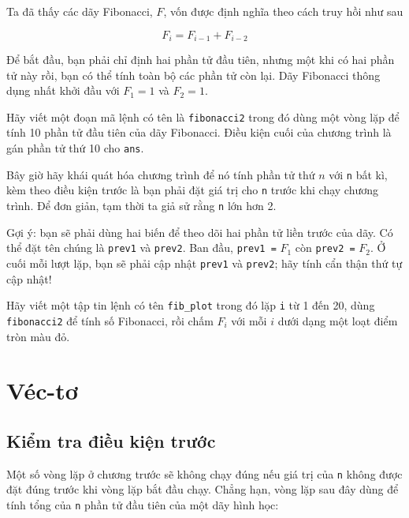\documentclass[12pt]{book}
\begin{document}
\begin{ex}
\label{fib2}

Ta đã thấy các dãy Fibonacci, $F$, vốn được định nghĩa theo cách
truy hồi như sau

\[ F_{i} = F_{i-1} + F_{i-2} \]

Để bắt đầu, bạn phải chỉ định hai phần tử đầu tiên, nhưng một khi
có hai phần tử này rồi, bạn có thể tính toàn bộ các phần tử còn lại.
Dãy Fibonacci thông dụng nhất khởi đầu với $F_1 = 1$ và $F_2 = 1$.

Hãy viết một đoạn mã lệnh có tên là {\tt fibonacci2} trong đó dùng
một vòng lặp để tính 10 phần tử đầu tiên của dãy Fibonacci. Điều 
kiện cuối của chương trình là gán phần tử thứ 10 cho {\tt ans}.

Bây giờ hãy khái quát hóa chương trình để nó tính phần tử thứ
$n$ với {\tt n} bất kì, kèm theo điều kiện trước là bạn phải đặt 
giá trị cho {\tt n} trước khi chạy chương trình. Để đơn giản, tạm thời
ta giả sử rằng {\tt n} lớn hơn 2.

Gợi ý: bạn sẽ phải dùng hai biến để theo dõi hai phần tử liền trước
của dãy. Có thể đặt tên chúng là {\tt prev1} và {\tt prev2}.
Ban đầu, {\tt prev1 =} $F_1$ còn {\tt prev2 =} $F_2$.  Ở cuối
mỗi lượt lặp, bạn sẽ phải cập nhật {\tt prev1} và {\tt prev2}; 
hãy tính cẩn thận thứ tự cập nhật!
\end{ex}


\begin{ex}
\label{fib_plot}

Hãy viết một tập tin lệnh có tên \verb#fib_plot# trong đó lặp {\tt i}
từ 1 đến 20, dùng {\tt fibonacci2} để tính số Fibonacci, rồi chấm 
$F_i$ với mỗi $i$ dưới dạng một loạt điểm tròn màu đỏ.

\end{ex}


\chapter{Véc-tơ}
\label{vectors}

\section{Kiểm tra điều kiện trước}

Một số vòng lặp ở chương trước sẽ không chạy đúng nếu
giá trị của {\tt n} không được đặt đúng trước khi vòng lặp bắt đầu
chạy. Chẳng hạn, vòng lặp sau đây dùng để tính tổng của {\tt n} 
phần tử đầu tiên của một dãy hình học:
\end{document}
